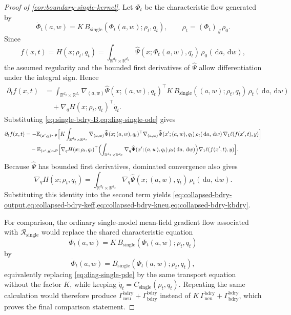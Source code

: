 \documentclass[11pt]{article}
\theoremstyle{definition}
\newcommand{\R}{\mathbb{R}}
\newcommand{\E}{\mathbb{E}}
\newcommand{\dd}{\,\mathrm{d}}
\begin{document}
\begin{proof}[Proof of \cref{cor:boundary-single-kernel}]
Let $\Phi_t$ be the characteristic flow generated by
\[
  \dot\Phi_t(a,w)=K\,B_{\mathrm{single}}(\Phi_t(a,w);\rho_t,q_t),
  \qquad
  \rho_t=(\Phi_t)_\#\rho_0.
\]
Since
\[
  f(x,t)=H(x;\rho_t,q_t)
  =
  \int_{\R^{d_y}\times\R^{d_x}}
  \widehat\Psi(x;\Phi_t(a,w),q_t)\,\rho_0(\dd a,\dd w),
\]
the assumed regularity and the bounded first derivatives of $\widehat\Psi$
allow differentiation under the integral sign. Hence
  \begin{align*}
    \partial_t f(x,t)
    &=
    \int_{\R^{d_y}\times\R^{d_x}}
    \nabla_{(a,w)}\widehat\Psi(x;(a,w),q_t)^\top
    K\,B_{\mathrm{single}}((a,w);\rho_t,q_t)\,\rho_t(\dd a,\dd w)\\
    &\quad
    +
    \nabla_q H(x;\rho_t,q_t)^\top \dot q_t.
  \end{align*}
Substituting \cref{eq:single-bdry-B,eq:diag-single-ode} gives
\begin{align*}
  \partial_t f(x,t)
  &=
  -\E_{(x',y)\sim\mathsf P}
  \Bigl[
    K
    \int_{\R^{d_y}\times\R^{d_x}}
    \nabla_{(a,w)}\widehat\Psi(x;(a,w),q_t)^\top
    \nabla_{(a,w)}\widehat\Psi(x';(a,w),q_t)\,
    \rho_t(\dd a,\dd w)\,
    \nabla_1\ell(f(x',t),y)
  \Bigr]\\
  &\quad
  -
  \E_{(x',y)\sim\mathsf P}
  \Bigl[
    \nabla_q H(x;\rho_t,q_t)^\top
    \Bigl(
      \int_{\R^{d_y}\times\R^{d_x}}
      \nabla_q\widehat\Psi(x';(a,w),q_t)\,\rho_t(\dd a,\dd w)
    \Bigr)
    \nabla_1\ell(f(x',t),y)
  \Bigr].
\end{align*}
Because $\widehat\Psi$ has bounded first derivatives, dominated convergence also
gives
\[
  \nabla_q H(x;\rho_t,q_t)
  =
  \int_{\R^{d_y}\times\R^{d_x}}
  \nabla_q\widehat\Psi(x;(a,w),q_t)\,\rho_t(\dd a,\dd w).
\]
Substituting this identity into the second term yields
\cref{eq:collapsed-bdry-output,eq:collapsed-bdry-keff,eq:collapsed-bdry-kneu,eq:collapsed-bdry-kbdry}.

For comparison, the ordinary single-model mean-field gradient flow associated
with $\mathcal R_{\mathrm{single}}$ would replace the shared characteristic
equation
\[
  \dot\Phi_t(a,w)=K\,B_{\mathrm{single}}(\Phi_t(a,w);\rho_t,q_t)
\]
by
\[
  \dot\Phi_t(a,w)=B_{\mathrm{single}}(\Phi_t(a,w);\rho_t,q_t),
\]
equivalently replacing \eqref{eq:diag-single-pde} by the same transport
equation without the factor $K$, while keeping
\(
  \dot q_t=C_{\mathrm{single}}(\rho_t,q_t)
\).
Repeating the same calculation would therefore produce
\(
  \Gamma_{\mathrm{neu}}^{\mathrm{bdry}}+\Gamma_{\mathrm{bdry}}^{\mathrm{bdry}}
\)
instead of
\(
  K\,\Gamma_{\mathrm{neu}}^{\mathrm{bdry}}+\Gamma_{\mathrm{bdry}}^{\mathrm{bdry}}
\),
which proves the final comparison statement.
\end{proof}
\end{document}
